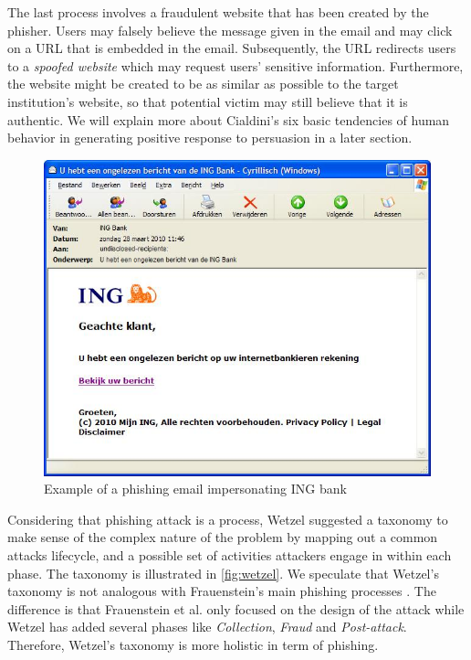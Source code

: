 The last process involves a fraudulent website that has been created
by the phisher. Users may falsely believe the message given in the
email and may click on a \ac{URL} that is embedded in the email.
Subsequently, the URL redirects users to a \textit{spoofed website}
which may request users' sensitive information. Furthermore, the website
might be created to be as similar as possible to the target institution's
website, so that potential victim may still believe that it is authentic.
We will explain more about Cialdini's six basic tendencies of human
behavior in generating positive response to persuasion \citep{cialdini:2001}
in a later section.

\begin{figure}
\begin{centering}
\includegraphics[scale=0.4]{gfx/ing-phishing}
\par\end{centering}

\protect\caption{\label{fig:ing}Example of a phishing email impersonating ING bank}
\end{figure}


Considering that phishing attack is a process, Wetzel \citep{wetzel:2005}
suggested a taxonomy to make sense of the complex nature of the problem
by mapping out a common attacks lifecycle, and a possible set of activities
attackers engage in within each phase. The taxonomy is illustrated
in \autoref{fig:wetzel}. We speculate that Wetzel's taxonomy is not
analogous with Frauenstein's main phishing processes \citep{frauenstein:2013}.
The difference is that Frauenstein et al. only focused on the design
of the attack while Wetzel has added several phases like \textit{Collection},
\textit{Fraud} and \textit{Post-attack}. Therefore, Wetzel's taxonomy
is more holistic in term of phishing.

